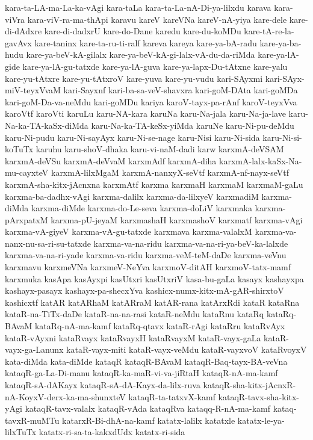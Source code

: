 {kara-ta-LA-ma-La-ka-vAgi
kara-taLa
kara-ta-La-nA-Di-ya-lilxdu
karava
kara-viVra
kara-viV-ra-ma-thApi
karavu
kareV
kareVNa
kareV-nA-yiya
kare-dele
kare-di-dAdxre
kare-di-dadxrU
kare-do-Dane
karedu
kare-du-koMDu
kare-tA-re-la-gavAvx
kare-taninx
kare-ta-ru-ti-ralf
kareva
kareya
kare-ya-bA-radu
kare-ya-ba-hudu
kare-ya-beV-kA-gilalx
kare-ya-beV-kA-gi-lalx-vA-du-da-riMda
kare-ya-lA-gide
kare-ya-lA-gu-tatxde
kare-ya-lA-guva
kare-ya-lapx-Du-tAtxne
kare-yalu
kare-yu-tAtxre
kare-yu-tAtxroV
kare-yuva
kare-yu-vudu
kari-SAyxmi
kari-SAyx-miV-teyxVvaM
kari-Sayxnf
kari-ba-sa-veV-shavxra
kari-goM-DAta
kari-goMDa
kari-goM-Da-va-neMdu
kari-goMDu
kariya
karoV-tayx-pa-rAnf
karoV-teyxVva
karoVtf
karoVti
karuLu
karu-NA-kara
karuNa
karu-Na-jala
karu-Na-ja-lave
karu-Na-ka-TA-kaSx-diMda
karu-Na-ka-TA-keSx-yiMda
karuNe
karu-Ni-pu-deMdu
karu-Ni-pudu
karu-Ni-sayAyx
karu-Ni-se-nage
karu-Nisi
karu-Ni-sida
karu-Ni-si-koTuTx
karuhu
karu-shoV-dhaka
karu-vi-naM-dadi
karw
karxmA-deVSAM
karxmA-deVSu
karxmA-deVvaM
karxmAdf
karxmA-diha
karxmA-lalx-kaSx-Na-mu-cayxteV
karxmA-lilxMgaM
karxmA-nanxyX-seVtf
karxmA-nf-nayx-seVtf
karxmA-sha-kitx-jAcnxna
karxmAtf
karxma
karxmaH
karxmaM
karxmaM-gaLu
karxma-ba-dadhx-vAgi
karxma-dalilx
karxma-da-lilxyeV
karxmadiM
karxma-diMda
karxma-diMde
karxma-do-Le-seva
karxma-doLiV
karxmaka
karxma-pArxpatxM
karxma-pU-jeyaM
karxmashaH
karxmashoV
karxmatf
karxma-vAgi
karxma-vA-giyeV
karxma-vA-gu-tatxde
karxmava
karxma-valalxM
karxma-va-nanx-nu-sa-ri-su-tatxde
karxma-va-na-ridu
karxma-va-na-ri-ya-beV-ka-lalxde
karxma-va-na-ri-yade
karxma-va-ridu
karxma-veM-teM-daDe
karxma-veVnu
karxmavu
karxmeVNa
karxmeV-NeYva
karxmoV-ditAH
karxmoV-tatx-mamf
karxmuka
kasApa
kasAyxpi
kasUtxri
kasUtxriV
kasa-bu-gaLa
kasayx
kashayxpa
kashayx-pasayx
kashayx-pa-shecxYva
kashicx-numx-kitx-mA-gAR-shirxtoV
kashicxtf
katAR
katARhaM
katARraM
katAR-rana
katArxRdi
kataR
kataRna
kataR-na-TiTx-daDe
kataR-na-na-rasi
kataR-neMdu
kataRnu
kataRq
kataRq-BAvaM
kataRq-nA-ma-kamf
kataRq-qtavx
kataR-rAgi
kataRru
kataRvAyx
kataR-vAyxni
kataRvayx
kataRvayxH
kataRvayxM
kataR-vayx-gaLa
kataR-vayx-ga-Lanunx
kataR-vayx-miti
kataR-vayx-veMdu
kataR-vayxvoV
kataRvoyxV
kata-diMda
kata-diMde
kataqR
kataqR-BAvaM
kataqR-Baq-tayx-BA-veVna
kataqR-ga-La-Di-manu
kataqR-ka-maR-vi-va-jiRtaH
kataqR-nA-ma-kamf
kataqR-sA-dAKayx
kataqR-sA-dA-Kayx-da-lilx-ruva
kataqR-sha-kitx-jAcnxR-nA-KoyxV-derx-ka-ma-shunxteV
kataqR-ta-tatxvX-kamf
kataqR-tavx-sha-kitx-yAgi
kataqR-tavx-valalx
kataqR-vAda
kataqRva
kataqq-R-nA-ma-kamf
kataq-tavxR-muMTu
katarxR-Bi-dhA-na-kamf
katatx-lalilx
katatxle
katatx-le-ya-lilxTuTx
katatx-ri-sa-ta-kakxdUdx
katatx-ri-sida
}
